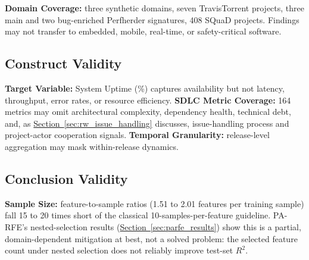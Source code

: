 \documentclass[technologies,article,submit,pdftex,moreauthors]{Definitions/mdpi}
\begin{document}
\textbf{Domain Coverage:} three synthetic domains, seven TravisTorrent projects, three main and two bug-enriched Perfherder signatures, 408 SQuaD projects. Findings may not transfer to embedded, mobile, real-time, or safety-critical software.

\subsection{Construct Validity}\label{sec:construct_validity}

\textbf{Target Variable:} System Uptime (\%) captures availability but not latency, throughput, error rates, or resource efficiency. \textbf{SDLC Metric Coverage:} 164 metrics may omit architectural complexity, dependency health, technical debt, and, as \hyperref[sec:rw_issue_handling]{Section~\ref*{sec:rw_issue_handling}} discusses, issue-handling process and project-actor cooperation signals. \textbf{Temporal Granularity:} release-level aggregation may mask within-release dynamics.

\subsection{Conclusion Validity}\label{sec:conclusion_validity}

\textbf{Sample Size:} feature-to-sample ratios (1.51 to 2.01 features per training sample) fall 15 to 20 times short of the classical 10-samples-per-feature guideline. PA-RFE's nested-selection results (\hyperref[sec:parfe_results]{Section~\ref*{sec:parfe_results}}) show this is a partial, domain-dependent mitigation at best, not a solved problem: the selected feature count under nested selection does not reliably improve test-set \(R^2\).
\end{document}
